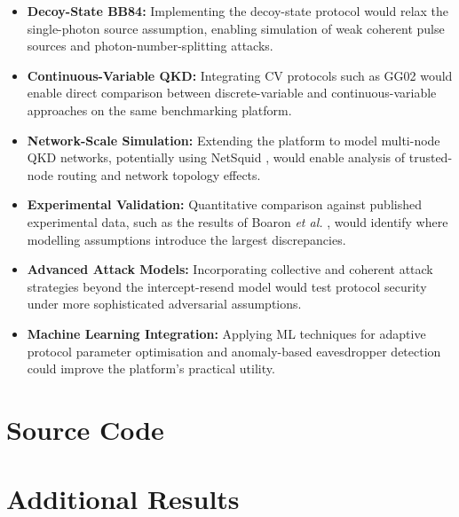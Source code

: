 \documentclass[10pt, a4paper]{report}
\renewcommand{\footnotesize}{\fontsize{8}{9}\selectfont}
\begin{document}
\begin{itemize}
    \item \textbf{Decoy-State BB84:} Implementing the decoy-state protocol \cite{Lo2005Decoy} would relax the single-photon source assumption, enabling simulation of weak coherent pulse sources and photon-number-splitting attacks. %

    \item \textbf{Continuous-Variable QKD:} Integrating CV protocols such as GG02 would enable direct comparison between discrete-variable and continuous-variable approaches on the same benchmarking platform. %

    \item \textbf{Network-Scale Simulation:} Extending the platform to model multi-node QKD networks, potentially using NetSquid \cite{NetSquid2021}, would enable analysis of trusted-node routing and network topology effects. %

    \item \textbf{Experimental Validation:} Quantitative comparison against published experimental data, such as the results of Boaron \textit{et al.} \cite{Boaron2018}, would identify where modelling assumptions introduce the largest discrepancies. %

    \item \textbf{Advanced Attack Models:} Incorporating collective and coherent attack strategies beyond the intercept-resend model would test protocol security under more sophisticated adversarial assumptions. %

    \item \textbf{Machine Learning Integration:} Applying ML techniques for adaptive protocol parameter optimisation and anomaly-based eavesdropper detection could improve the platform's practical utility. %
\end{itemize}



\clearpage
{\footnotesize


}

\appendix

\chapter{Source Code}

\chapter{Additional Results}
\end{document}
